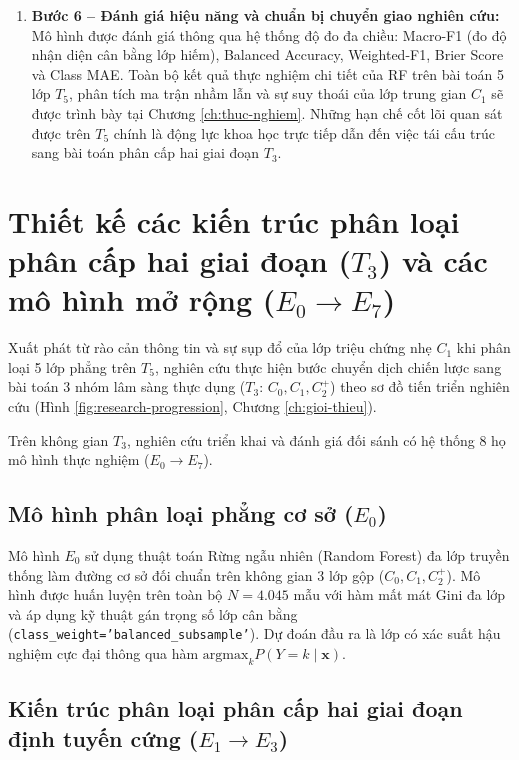 \begin{enumerate}
    \item \textbf{Bước 6 -- Đánh giá hiệu năng và chuẩn bị chuyển giao nghiên cứu:} 
    Mô hình được đánh giá thông qua hệ thống độ đo đa chiều: Macro-F1 (đo độ nhận diện cân bằng lớp hiếm), Balanced Accuracy, Weighted-F1, Brier Score và Class MAE. Toàn bộ kết quả thực nghiệm chi tiết của RF trên bài toán 5 lớp $T_5$, phân tích ma trận nhầm lẫn và sự suy thoái của lớp trung gian $C_1$ sẽ được trình bày tại Chương \ref{ch:thuc-nghiem}. Những hạn chế cốt lõi quan sát được trên $T_5$ chính là động lực khoa học trực tiếp dẫn đến việc tái cấu trúc sang bài toán phân cấp hai giai đoạn $T_3$.
\end{enumerate}

\section{Thiết kế các kiến trúc phân loại phân cấp hai giai đoạn ($T_3$) và các mô hình mở rộng ($E_0 \to E_7$)}
\label{sec:thiet-ke-kien-truc-mo-hinh}

Xuất phát từ rào cản thông tin và sự sụp đổ của lớp triệu chứng nhẹ $C_1$ khi phân loại 5 lớp phẳng trên $T_5$, nghiên cứu thực hiện bước chuyển dịch chiến lược sang bài toán 3 nhóm lâm sàng thực dụng ($T_3$: $C_0, C_1, C_2^+$) theo sơ đồ tiến triển nghiên cứu (Hình \ref{fig:research-progression}, Chương \ref{ch:gioi-thieu}).

Trên không gian $T_3$, nghiên cứu triển khai và đánh giá đối sánh có hệ thống 8 họ mô hình thực nghiệm ($E_0 \to E_7$).

\subsection{Mô hình phân loại phẳng cơ sở ($E_0$)}
\label{subsec:e0-flat}

Mô hình $E_0$ sử dụng thuật toán Rừng ngẫu nhiên (Random Forest) đa lớp truyền thống làm đường cơ sở đối chuẩn trên không gian 3 lớp gộp ($C_0, C_1, C_2^+$). Mô hình được huấn luyện trên toàn bộ $N = 4.045$ mẫu với hàm mất mát Gini đa lớp và áp dụng kỹ thuật gán trọng số lớp cân bằng (\texttt{class\_weight='balanced\_subsample'}). Dự đoán đầu ra là lớp có xác suất hậu nghiệm cực đại thông qua hàm $\text{argmax}_k P(Y=k \mid \mathbf{x})$.

\subsection{Kiến trúc phân loại phân cấp hai giai đoạn định tuyến cứng ($E_1 \to E_3$)}
\label{subsec:hard-hierarchical}

